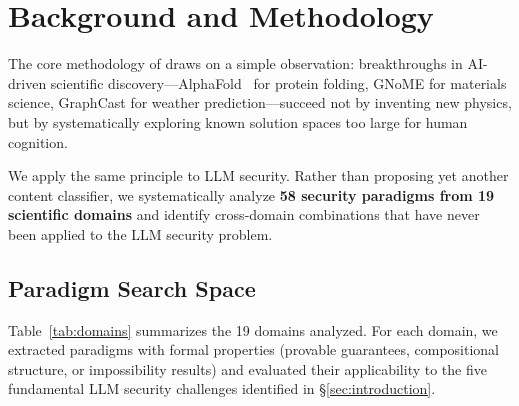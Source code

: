 \section{Background and Methodology}
\label{sec:background}

The core methodology of \sentinel draws on a simple observation: breakthroughs in AI-driven scientific discovery---AlphaFold~\cite{alphafold2021} for protein folding, GNoME for materials science, GraphCast for weather prediction---succeed not by inventing new physics, but by systematically exploring known solution spaces too large for human cognition.

We apply the same principle to LLM security. Rather than proposing yet another content classifier, we systematically analyze \textbf{58 security paradigms from 19 scientific domains} and identify cross-domain combinations that have never been applied to the LLM security problem.

\subsection{Paradigm Search Space}

Table~\ref{tab:domains} summarizes the 19 domains analyzed. For each domain, we extracted paradigms with formal properties (provable guarantees, compositional structure, or impossibility results) and evaluated their applicability to the five fundamental LLM security challenges identified in \S\ref{sec:introduction}.

